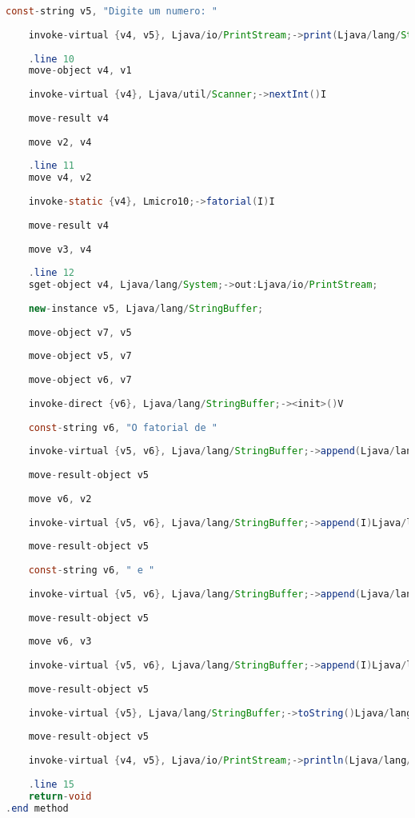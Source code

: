 \documentclass[hidelinks,12pt]{article}
\begin{document}
\begin{lstlisting}[caption=Smali resultante do .java,language=java]
	const-string v5, "Digite um numero: "
	
	invoke-virtual {v4, v5}, Ljava/io/PrintStream;->print(Ljava/lang/String;)V
	
	.line 10
	move-object v4, v1
	
	invoke-virtual {v4}, Ljava/util/Scanner;->nextInt()I
	
	move-result v4
	
	move v2, v4
	
	.line 11
	move v4, v2
	
	invoke-static {v4}, Lmicro10;->fatorial(I)I
	
	move-result v4
	
	move v3, v4
	
	.line 12
	sget-object v4, Ljava/lang/System;->out:Ljava/io/PrintStream;
	
	new-instance v5, Ljava/lang/StringBuffer;
	
	move-object v7, v5
	
	move-object v5, v7
	
	move-object v6, v7
	
	invoke-direct {v6}, Ljava/lang/StringBuffer;-><init>()V
	
	const-string v6, "O fatorial de "
	
	invoke-virtual {v5, v6}, Ljava/lang/StringBuffer;->append(Ljava/lang/String;)Ljava/lang/StringBuffer;
	
	move-result-object v5
	
	move v6, v2
	
	invoke-virtual {v5, v6}, Ljava/lang/StringBuffer;->append(I)Ljava/lang/StringBuffer;
	
	move-result-object v5
	
	const-string v6, " e "
	
	invoke-virtual {v5, v6}, Ljava/lang/StringBuffer;->append(Ljava/lang/String;)Ljava/lang/StringBuffer;
	
	move-result-object v5
	
	move v6, v3
	
	invoke-virtual {v5, v6}, Ljava/lang/StringBuffer;->append(I)Ljava/lang/StringBuffer;
	
	move-result-object v5
	
	invoke-virtual {v5}, Ljava/lang/StringBuffer;->toString()Ljava/lang/String;
	
	move-result-object v5
	
	invoke-virtual {v4, v5}, Ljava/io/PrintStream;->println(Ljava/lang/String;)V
	
	.line 15
	return-void
.end method	
	
	\end{lstlisting}
	
\end{document}
